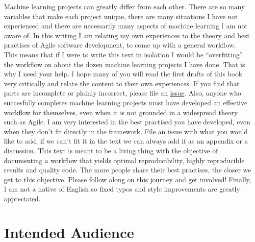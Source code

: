 \documentclass[]{book}
\begin{document}
Machine learning projects can greatly differ from each other. There are so many variables that make each project unique, there are many situations I have not experienced and there are necessarily many aspects of machine learning I am not aware of. In this writing I am relating my own experiences to the theory and best practises of Agile software development, to come up with a general workflow. This means that if I were to write this text in isolation I would be ``overfitting'' the workflow on about the dozen machine learning projects I have done. That is why I need your help. I hope many of you will read the first drafts of this book very critically and relate the content to their own experiences. If you find that parts are incomplete or plainly incorrect, please file an \href{https://github.com/EdwinTh/AMLwR}{issue}. Also, anyone who succesfully completes machine learning projects must have developed an effective workflow for themselves, even when it is not grounded in a widespread theory such as Agile. I am very interested in the best practised you have developed, even when they don't fit directly in the framework. File an issue with what you would like to add, if we can't fit it in the text we can always add it as an appendix or a discussion. This text is meant to be a living thing with the objective of documenting a workflow that yields optimal reproducibility, highly reproducible results and quality code. The more people share their best practises, the closer we get to this objective. Please follow along on this journey and get involved! Finally, I am not a native of English so fixed typos and style improvements are greatly appreciated.

\hypertarget{intended-audience}{%
\section{Intended Audience}\label{intended-audience}}
\end{document}
